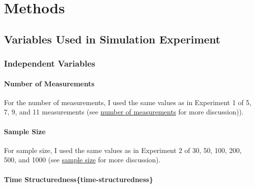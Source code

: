 \documentclass[
12pt, %
twoside,
english]{guelphthesis}
\theoremstyle{definition}
\theoremstyle{definition}
\theoremstyle{definition}
\theoremstyle{definition}
\theoremstyle{remark}
\begin{document}
\hypertarget{methods-2}{%
\section{Methods}\label{methods-2}}

\hypertarget{variables-used-in-simulation-experiment-2}{%
\subsection{Variables Used in Simulation Experiment}\label{variables-used-in-simulation-experiment-2}}

\hypertarget{independent-variables-2}{%
\subsubsection{Independent Variables}\label{independent-variables-2}}

\hypertarget{number-of-measurements-2}{%
\paragraph{Number of Measurements}\label{number-of-measurements-2}}

For the number of measurements, I used the same values as in Experiment 1 of 5, 7, 9, and 11 measurements (see \protect\hyperlink{number-measurements}{number of measurements} for more discussion)).

\hypertarget{sample-size-1}{%
\paragraph{Sample Size}\label{sample-size-1}}

For sample size, I used the same values as in Experiment 2 of 30, 50, 100, 200, 500, and 1000 (see \protect\hyperlink{sample-size}{sample size} for more discussion).

\hypertarget{time-structurednesstime-structuredness}{%
\paragraph{Time Structuredness\{time-structuredness\}}\label{time-structurednesstime-structuredness}}
\end{document}
